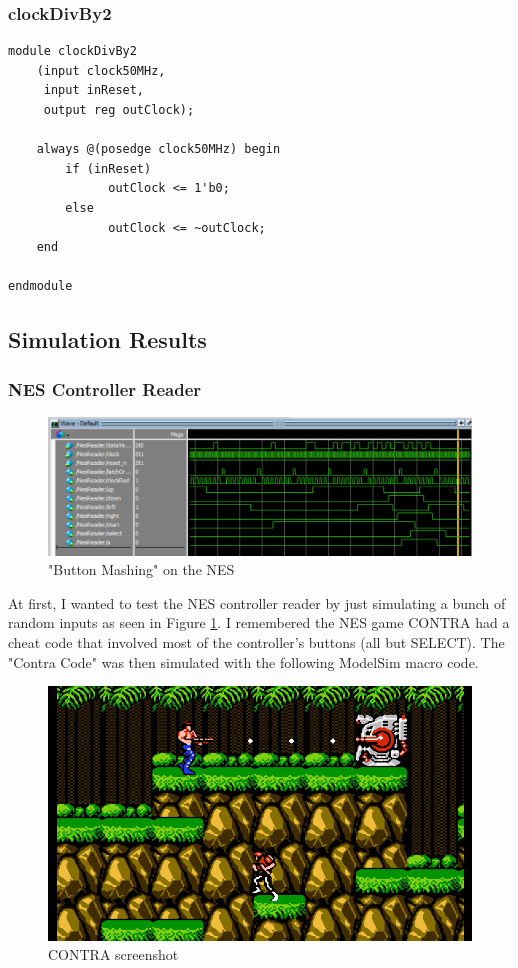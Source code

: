 \documentclass[a4paper]{article}
\begin{document}
\subsubsection{clockDivBy2}

\begin{Verbatim}
module clockDivBy2
	(input clock50MHz,
	 input inReset,
	 output reg outClock);

	always @(posedge clock50MHz) begin
		if (inReset)
			  outClock <= 1'b0;
		else
			  outClock <= ~outClock;
	end

endmodule
\end{Verbatim}

\subsection{Simulation Results}%

\subsubsection{NES Controller Reader}
\begin{figure}[H]
    \includegraphics[width=0.8 \linewidth]{images/NESSIM.png}
    \caption{"Button Mashing" on the NES}
    \label{nesButtonMash}
\end{figure}

At first, I wanted to test the NES controller reader by just simulating a bunch of random inputs as seen in Figure \ref{nesButtonMash}. I remembered the NES game CONTRA had a cheat code that involved most of the controller's buttons (all but SELECT). The "Contra Code" was then simulated with the following ModelSim macro code.
 
\begin{figure}[H]
    \includegraphics[width=0.8 \linewidth]{images/contra.jpg}
    \caption{CONTRA screenshot}
    \label{contra}
\end{figure}
\end{document}
